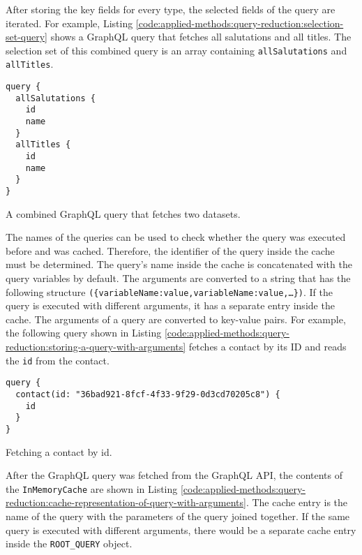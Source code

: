 After storing the key fields for every type, the selected fields of the query are iterated. For example, Listing \ref{code:applied-methods:query-reduction:selection-set-query} shows a GraphQL query that fetches all salutations and all titles. The selection set of this combined query is an array containing \texttt{allSalutations} and \texttt{allTitles}.

\ifshowListings
\begin{listing}[H]
\begin{verbatim}
query {
  allSalutations {
    id
    name
  }
  allTitles {
    id
    name
  }
}
\end{verbatim}
\caption{A combined GraphQL query that fetches two datasets.}\label{code:applied-methods:query-reduction:selection-set-query}
\end{listing}
\fi

\noindent The names of the queries can be used to check whether the query was executed before and was cached. Therefore, the identifier of the query inside the cache must be determined. The query's name inside the cache is concatenated with the query variables by default. The arguments are converted to a string that has the following structure \texttt{(\{variableName:value,variableName:value,\dots\})}. If the query is executed with different arguments, it has a separate entry inside the cache. The arguments of a query are converted to key-value pairs. For example, the following query shown in Listing \ref{code:applied-methods:query-reduction:storing-a-query-with-arguments} fetches a contact by its \ac{ID} and reads the \texttt{id} from the contact.

\ifshowListings
\begin{listing}[H]
\begin{verbatim}
query {
  contact(id: "36bad921-8fcf-4f33-9f29-0d3cd70205c8") {
    id
  }
}
\end{verbatim}
\caption{Fetching a contact by id.}\label{code:applied-methods:query-reduction:storing-a-query-with-arguments}
\end{listing}
\fi

\noindent After the GraphQL query was fetched from the GraphQL \ac{API}, the contents of the \texttt{InMemoryCache} are shown in Listing \ref{code:applied-methods:query-reduction:cache-representation-of-query-with-arguments}. The cache entry is the name of the query with the parameters of the query joined together. If the same query is executed with different arguments, there would be a separate cache entry inside the \texttt{ROOT\_QUERY} object.

